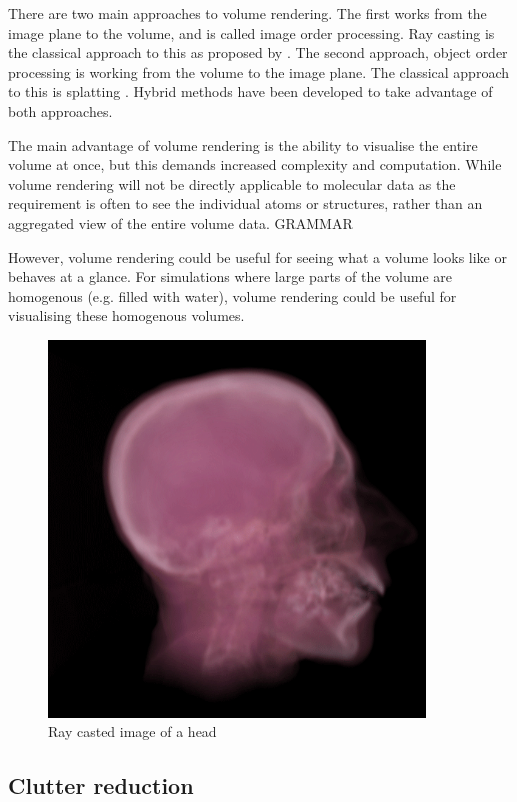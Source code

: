 There are two main approaches to volume rendering. The first works from the
image plane to the volume, and is called image order processing. Ray casting is
the classical approach to this as proposed by \citet{levoy88}. The second
approach, object order processing is working from the volume to the image
plane. The classical approach to this is splatting \citep{westover89}. Hybrid
methods have been developed to take advantage of both approaches.

The main advantage of volume rendering is the ability to visualise the entire
volume at once, but this demands increased complexity and computation.  While
volume rendering will not be directly applicable to molecular data as the
requirement is often to see the individual atoms or structures, rather than an
aggregated view of the entire volume data.
GRAMMAR

However, volume rendering could be useful for seeing what a volume looks like
or behaves at a glance. For simulations where large parts of the volume are
homogenous (e.g. filled with water), volume rendering could be useful for
visualising these homogenous volumes.

\begin{figure}[h!]
  \begin{center}
    \includegraphics[width=100mm]{head_volume}
  \end{center}
  \caption{Ray casted image of a head}
  \label{fig:background_head}
\end{figure}


\subsection{Clutter reduction}
\label{sub:background_clutter}

